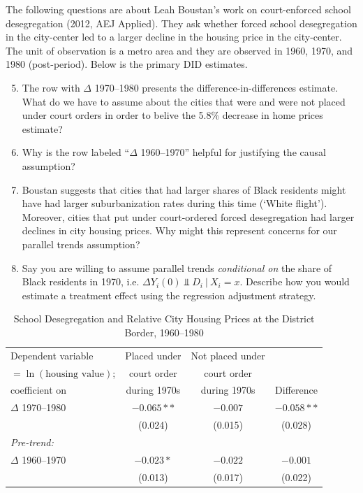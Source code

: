 \documentclass[12pt]{article}
\begin{document}
\newpage
\noindent The following questions are about Leah Boustan's work on court-enforced school desegregation (2012, AEJ Applied).
They ask whether forced school desegregation in the city-center led to a larger decline in the housing price in the city-center.
The unit of observation is a metro area and they are observed in 1960, 1970, and 1980 (post-period).
Below is the primary DID estimates.

\bigskip
\begin{enumerate}
  \setcounter{enumi}{4}
  \item The row with $\Delta$ 1970--1980 presents the difference-in-differences estimate. 
  What do we have to assume about the cities that were and were not placed under court orders in order to belive the 5.8\% decrease in home prices estimate?
  
  \medskip
  \item Why is the row labeled ``$\Delta$ 1960--1970'' helpful for justifying the causal assumption?
  
  \medskip
  \item Boustan suggests that cities that had larger shares of Black residents might have had larger suburbanization rates during this time (`White flight'). 
  Moreover, cities that put under court-ordered forced desegregation had larger declines in city housing prices.
  Why might this represent concerns for our parallel trends assumption?

  \medskip
  \item Say you are willing to assume parallel trends \emph{conditional on} the share of Black residents in 1970, i.e. $\Delta Y_i(0) \Perp D_i \ \vert \ X_i = x$.
  Describe how you would estimate a treatment effect using the regression adjustment strategy. 
\end{enumerate}

\bigskip
\begin{table}[hb]
\centering
\caption{School Desegregation and Relative City Housing Prices at the District Border, 1960--1980}
\label{tab:desegregation}
\begin{tabular}{lccc}
\toprule
Dependent variable & Placed under & Not placed under & \\
$= \ln(\text{housing value})$; & court order & court order & \\
coefficient on & during 1970s & during 1970s & Difference \\
\midrule
$\Delta$ 1970--1980 & $-0.065**$ & $-0.007$ & $-0.058**$ \\
     & (0.024) & (0.015) & (0.028) \\[0.5em]
\textit{Pre-trend:} & & & \\
$\Delta$ 1960--1970 & $-0.023*$ & $-0.022$ & $-0.001$ \\
     & (0.013) & (0.017) & (0.022) \\
\bottomrule
\end{tabular}
\end{table}
\end{document}
